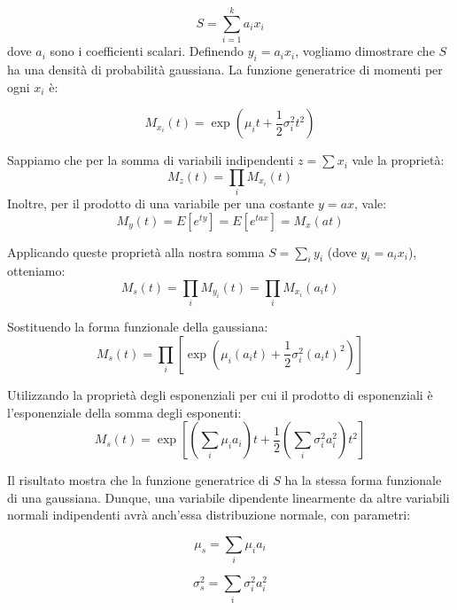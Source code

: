 \documentclass[openany,a4paper,12pt]{book}
\theoremstyle{remark}
\begin{document}
\begin{equation}
S = \sum_{i=1}^{k} a_i x_i
\end{equation}
dove $a_i$ sono i coefficienti scalari.
Definendo $y_i= a_i x_i$, vogliamo dimostrare che $S$ ha una densità di probabilità gaussiana.
La funzione generatrice di momenti per ogni $x_i$ è:

\begin{equation}
M_{x_i}(t) = \exp \left( \mu_i t + \frac{1}{2} \sigma_i^2 t^2 \right)
\end{equation}

Sappiamo che per la somma di variabili indipendenti $z = \sum x_i$ vale la proprietà:
\begin{equation}
M_z(t) = \prod_{i} M_{x_i}(t)  
\end{equation}
Inoltre, per il prodotto di una variabile per una costante $y = ax$, vale:
\begin{equation}
M_y(t) = E[e^{t y}] = E[e^{tax}] = M_x(at) 
\end{equation}

Applicando queste proprietà alla nostra somma $S = \sum_{i} y_i$ (dove $y_i = a_i x_i$), otteniamo:
\begin{equation}
M_s(t) = \prod_{i} M_{y_i}(t) = \prod_{i} M_{x_i}(a_i t)
\end{equation}

Sostituendo la forma funzionale della gaussiana:
\begin{equation}
M_s(t) = \prod_{i} \left[ \exp \left( \mu_i (a_i t) + \frac{1}{2} \sigma_i^2 (a_i t)^2 \right) \right]
\end{equation}

Utilizzando la proprietà degli esponenziali per cui il prodotto di esponenziali è l'esponenziale della somma degli esponenti:
\begin{equation}
M_s(t) = \exp \left[ \left(\sum_{i} \mu_i a_i\right) t + \frac{1}{2} \left( \sum_{i} \sigma_i^2 a_i^2 \right) t^2 \right]
\end{equation}

Il risultato mostra che la funzione generatrice di $S$ ha la stessa forma funzionale di una gaussiana. Dunque, una variabile dipendente linearmente da altre variabili normali indipendenti avrà anch'essa distribuzione normale, con parametri:

\begin{equation}
\mu_s = \sum_{i} \mu_i a_i
\end{equation}

\begin{equation}
\sigma_s^2 = \sum_{i} \sigma_i^2 a_i^2
\end{equation}
\end{document}
